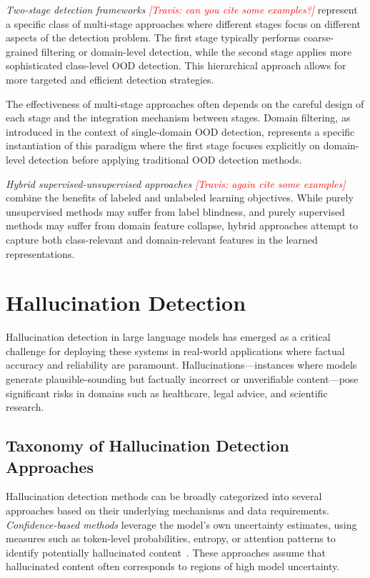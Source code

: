 \documentclass[11pt, oneside]{book}
\theoremstyle{plain}
\theoremstyle{definition}
\theoremstyle{remark}
\newcommand{\travis}[1]{\textcolor{red}{{\it [Travis: #1]}}}
\begin{document}
\emph{Two-stage detection frameworks} \travis{can you cite some examples?} represent a specific class of multi-stage approaches where different stages focus on different aspects of the detection problem. The first stage typically performs coarse-grained filtering or domain-level detection, while the second stage applies more sophisticated class-level OOD detection. This hierarchical approach allows for more targeted and efficient detection strategies.

The effectiveness of multi-stage approaches often depends on the careful design of each stage and the integration mechanism between stages. Domain filtering, as introduced in the context of single-domain OOD detection, represents a specific instantiation of this paradigm where the first stage focuses explicitly on domain-level detection before applying traditional OOD detection methods.

\emph{Hybrid supervised-unsupervised approaches} \travis{again cite some examples} combine the benefits of labeled and unlabeled learning objectives. While purely unsupervised methods may suffer from label blindness, and purely supervised methods may suffer from domain feature collapse, hybrid approaches attempt to capture both class-relevant and domain-relevant features in the learned representations.

\section{Hallucination Detection}

Hallucination detection in large language models has emerged as a critical challenge for deploying these systems in real-world applications where factual accuracy and reliability are paramount. Hallucinations—instances where models generate plausible-sounding but factually incorrect or unverifiable content—pose significant risks in domains such as healthcare, legal advice, and scientific research.

\subsection{Taxonomy of Hallucination Detection Approaches}

Hallucination detection methods can be broadly categorized into several approaches based on their underlying mechanisms and data requirements. \emph{Confidence-based methods} leverage the model's own uncertainty estimates, using measures such as token-level probabilities, entropy, or attention patterns to identify potentially hallucinated content~\citep{manakul2023selfcheckgpt,zhang2023sirens}. These approaches assume that hallucinated content often corresponds to regions of high model uncertainty.
\end{document}
